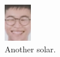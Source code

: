 \documentclass{article}
\begin{document}
\begin{figure}[h!]
\begin{subfigure}[b]{0.3\linewidth}
\includegraphics[width=\linewidth]{assets/solar.png}
\caption{Another solar.}
\end{subfigure}
\begin{subfigure}[b]{0.3\linewidth}

\end{subfigure}
\end{figure}
\end{document}
